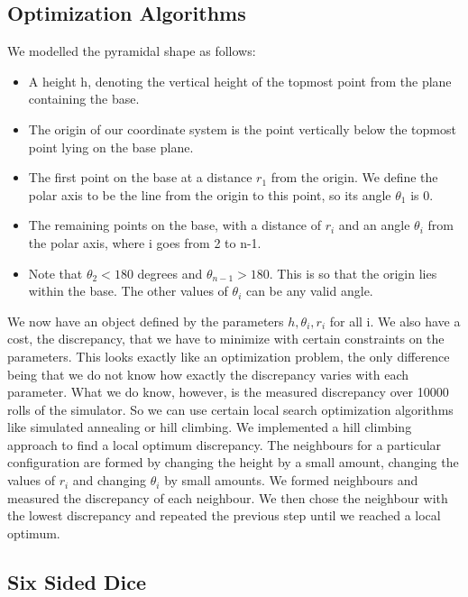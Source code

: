 \subsection{Optimization Algorithms}
We modelled the pyramidal shape as follows:\\
\begin{itemize}
    \item A height h, denoting the vertical height of the topmost point from the plane containing the base.\\
    \item The origin of our coordinate system is the point vertically below the topmost point lying on the base plane.\\
    \item The first point on the base at a distance $r_1$ from the origin. We define the polar axis to be the line from the origin to this point, so its angle $\theta_1$ is 0.\\
    \item The remaining points on the base, with a distance of $r_i$ and an angle $\theta_i$ from the polar axis, where i goes from 2 to n-1.\\
    \item Note that $\theta_2 < 180$ degrees and $\theta_{n-1} > 180$. This is so that the origin lies within the base. The other values of $\theta_i$ can be any valid angle.\\
\end{itemize}
We now have an object defined by the parameters $h, \theta_i, r_i$ for all i. We also have a cost, the discrepancy, that we have to minimize with certain constraints on the parameters. This looks exactly like an optimization problem, the only difference being that we do not know how exactly the discrepancy varies with each parameter. What we do know, however, is the measured discrepancy over 10000 rolls of the simulator. So we can use certain local search optimization algorithms like simulated annealing or hill climbing. We implemented a hill climbing approach to find a local optimum discrepancy. The neighbours for a particular configuration are formed by changing the height by a small amount, changing the values of $r_i$ and changing $\theta_i$ by small amounts. We formed neighbours and measured the discrepancy of each neighbour. We then chose the neighbour with the lowest discrepancy and repeated the previous step until we reached a local optimum.\\

\subsection{Six Sided Dice}
